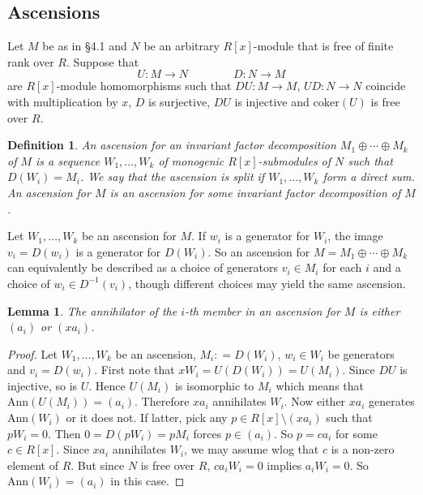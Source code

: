 \documentclass[11pt]{article}
\newtheorem{definition}[theo]{Definition}
\newtheorem{lemma}[theo]{Lemma}
\theoremstyle{definition}
\numberwithin{equation}{section}
\newcommand{\Ann}{\mathrm{Ann}}
\begin{document}
\subsection{Ascensions}      \label{ascensec}    Let $ M $ be as in \S4.1  and $ N $ be an arbitrary $R[x]$-module that is free of finite rank over $ R  $. Suppose that    
$$ U : M \to N \quad \quad  \quad \quad D : N \to M  $$ 
are $ R[x]$-module homomorphisms such that $ DU : M \to M  $, $  UD : N \to N $ coincide with multiplication by $ x $, $ D $ is surjective, $ DU $ is injective and $ \mathrm{coker}(U) $ is free over $ R $.   

\begin{definition} An \emph{ascension} for an invariant factor decomposition $ M_{1} \oplus \cdots \oplus M_{k}  $ of $ M $ is a sequence $ W_{1} ,   \ldots,  W_{k} $ of monogenic $ R[x]$-submodules of $ N $ such that $ D(W_{i})  =  M_{i}  $.  We say that  the ascension is \emph{split} if   $ W_{1} , \ldots, W_{k} $ form a direct sum.  An \emph{ascension for $ M $}     is an ascension for some invariant factor decomposition of $ M $.    
\end{definition} 

Let $ W_{1}, \ldots, W_{k} $ be an ascension for $ M $. If $ w_{i} $ is a generator for $ W_{i} $, the image $ v_{i} = D(w_{i}) $ is a generator for $ 
D(W_{i}    )     $. So an ascension for $ M = M_{1} \oplus \cdots \oplus M_{k} $ can equivalently be described as a choice of generators $ v_{i} \in M_{i} $ for each $ i $ and a choice of $ w_{i} \in D^{-1} (v_{i}) $, though different choices may yield the same ascension. 


\begin{lemma}  \label{annascen}     The annihilator of the $i$-th member in an ascension for $ M $   is    either $ (a_{i})  $ or $ (x a_{i}) $. 
\end{lemma} 

\begin{proof}   Let $ W_{1}, \ldots , W_{k} $ be an ascension, $ M _{i} : = D(W_{i}) $,  $ w_{i} \in W_{i} $ be generators and $ v_{i} = D(w_{i}) $.     First note that  $ x W_{i} = U(D (W_{i})) = U(M_{i}) $. Since $ DU $ is injective, so is $ U$. Hence $ U(M_{i})  $ is isomorphic to $ M_{i} $ which means that $  \mathrm{Ann}(U(M_{i})) = (a_{i}) $. Therefore $ xa_{i} $ annihilates $ W_{i} $.  Now either $ x a_{i} $ generates $ \Ann(W_{i}) $ or it does not.     If latter, pick any  $ p \in R[x] \setminus (x a_{i} ) $ such that $ p W_{i} = 0 $.  Then $ 0  =  D(p W_{i}) = p M_{i}  $  forces  $ p \in (a_{i} ) $. So $ p = c a_{i} $ for some $ c \in R[x] $. Since $ x a_{i} $ annihilates $ W_{i} $,  we may assume wlog that $ c $ is a non-zero element of $ R $.  But since $  N $ is free over $ R $, $ ca_{i} W_{i} = 0 $ implies $ a_{i}W_{i} = 0 $. So $  \mathrm{Ann}(W_{i} ) = (a_{i}) $ in this  case. 
\end{proof} 
 
\end{document}
